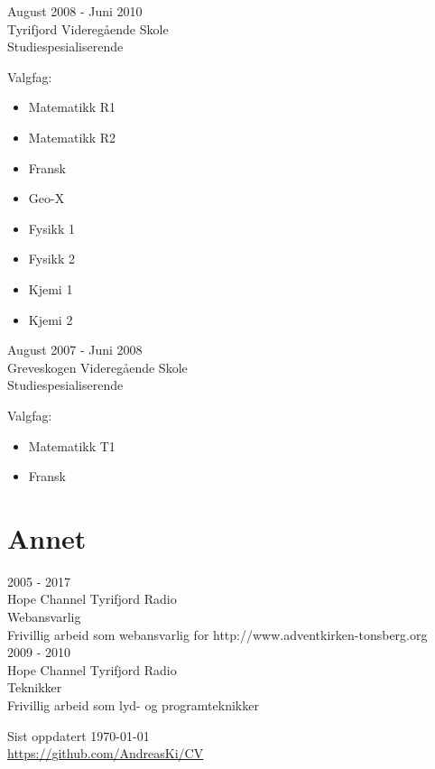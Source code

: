 \documentclass[norsk, 10pt, a4paper]{article}
\newcommand{\interval}[2]{\small{#1 - #2}}
\newcommand{\institution}[1]{\normalsize{#1}}
\newcommand{\position}[1]{\large{#1}}
\newcommand{\course}[2]{\position{\textsc{#1} #2}}
\newcommand{\desc}[1]{\normalsize{#1}}
\begin{document}
\interval{August 2008}{Juni 2010}\\
\institution{Tyrifjord Videregående Skole}\\
\course{}{Studiespesialiserende}\\
\desc{
  Valgfag: 
  \begin{itemize}
  \itemsep0.5pt
  \item Matematikk R1
  \item Matematikk R2
  \item Fransk
  \item Geo-X
  \item Fysikk 1
  \item Fysikk 2
  \item Kjemi 1
  \item Kjemi 2
  \end{itemize}
}

\interval{August 2007}{Juni 2008}\\
\institution{Greveskogen Videregående Skole}\\
\course{}{Studiespesialiserende}\\
\desc{
  Valgfag: 
  \begin{itemize}
  \itemsep0.5pt
  \item Matematikk T1
  \item Fransk
  \end{itemize}
}

\section*{Annet}

\interval{2005}{2017}\\
\institution{Hope Channel Tyrifjord Radio}\\
\course{}{Webansvarlig}\\
\desc{Frivillig arbeid som webansvarlig for http://www.adventkirken-tonsberg.org}\\

\interval{2009}{2010}\\
\institution{Hope Channel Tyrifjord Radio}\\
\course{}{Teknikker}\\
\desc{Frivillig arbeid som lyd- og programteknikker}

\vfill{}

\begin{center}
{
  \scriptsize Sist oppdatert \today\\
  \href{https://github.com/AndreasKi/CV}{https://github.com/AndreasKi/CV}
}
\end{center}
\end{document}
